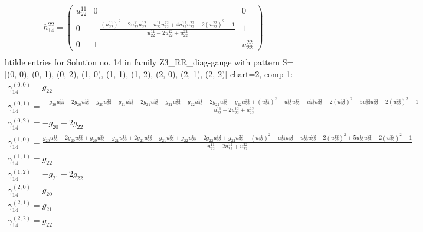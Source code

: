 \documentclass[a4paper, 11pt, twoside, onecolumn]{article}
\begin{document}
\begin{landscape}
\begin{gather*}
	 h_14^{22}=\begin{pmatrix}u^{11}_{22} & 0 & 0\\0 & - \frac{\left(u^{11}_{22}\right)^{2} - 2 u^{11}_{22} u^{12}_{22} - u^{11}_{22} u^{22}_{22} + 4 u^{12}_{22} u^{22}_{22} - 2 \left(u^{22}_{22}\right)^{2} - 1}{u^{11}_{22} - 2 u^{12}_{22} + u^{22}_{22}} & 1\\0 & 1 & u^{22}_{22}\end{pmatrix}\\ 
\end{gather*} 
htilde entries for Solution no. 14 in family Z3_RR_diag-gauge with pattern S=[(0, 0), (0, 1), (0, 2), (1, 0), (1, 1), (1, 2), (2, 0), (2, 1), (2, 2)] chart=2, comp 1: 
\begin{gather*} 
	 \gamma^{(0, 0)}_14=g_{22}\\ 
	 \gamma^{(0, 1)}_14=- \frac{g_{20} u^{11}_{22} - 2 g_{20} u^{12}_{22} + g_{20} u^{22}_{22} - g_{21} u^{11}_{22} + 2 g_{21} u^{12}_{22} - g_{21} u^{22}_{22} - g_{22} u^{11}_{22} + 2 g_{22} u^{12}_{22} - g_{22} u^{22}_{22} + \left(u^{11}_{22}\right)^{2} - u^{11}_{22} u^{12}_{22} - u^{11}_{22} u^{22}_{22} - 2 \left(u^{12}_{22}\right)^{2} + 5 u^{12}_{22} u^{22}_{22} - 2 \left(u^{22}_{22}\right)^{2} - 1}{u^{11}_{22} - 2 u^{12}_{22} + u^{22}_{22}}\\ 
	 \gamma^{(0, 2)}_14=- g_{20} + 2 g_{22}\\ 
	 \gamma^{(1, 0)}_14=\frac{g_{20} u^{11}_{22} - 2 g_{20} u^{12}_{22} + g_{20} u^{22}_{22} - g_{21} u^{11}_{22} + 2 g_{21} u^{12}_{22} - g_{21} u^{22}_{22} + g_{22} u^{11}_{22} - 2 g_{22} u^{12}_{22} + g_{22} u^{22}_{22} + \left(u^{11}_{22}\right)^{2} - u^{11}_{22} u^{12}_{22} - u^{11}_{22} u^{22}_{22} - 2 \left(u^{12}_{22}\right)^{2} + 5 u^{12}_{22} u^{22}_{22} - 2 \left(u^{22}_{22}\right)^{2} - 1}{u^{11}_{22} - 2 u^{12}_{22} + u^{22}_{22}}\\ 
	 \gamma^{(1, 1)}_14=g_{22}\\ 
	 \gamma^{(1, 2)}_14=- g_{21} + 2 g_{22}\\ 
	 \gamma^{(2, 0)}_14=g_{20}\\ 
	 \gamma^{(2, 1)}_14=g_{21}\\ 
	 \gamma^{(2, 2)}_14=g_{22}\\ 
\end{gather*} 

\end{landscape}
\end{document}
